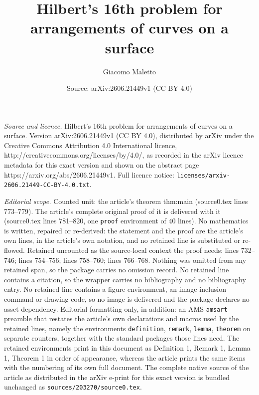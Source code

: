 \documentclass[10pt,a4paper]{amsart}
\title{Hilbert's 16th problem for arrangements of curves on a surface}
\author{Giacomo Maletto}
\date{Source: arXiv:2606.21449v1 (CC BY 4.0)}
\begin{document}
\maketitle

\noindent\emph{Source and licence.} Hilbert's 16th problem for arrangements of curves on a surface. Version arXiv:2606.21449v1 (CC BY 4.0), distributed by arXiv under the Creative Commons Attribution 4.0 International licence, http://creativecommons.org/licenses/by/4.0/, as recorded in the arXiv licence metadata for this exact version and shown on the abstract page https://arxiv.org/abs/2606.21449v1. Full licence notice: \texttt{licenses/arxiv-2606.21449-CC-BY-4.0.txt}.\par\smallskip

\noindent\textit{Editorial scope.} Counted unit: the article's theorem thm:main (source0.tex lines 773--779). The article's complete original proof of it is delivered with it (source0.tex lines 781--820, one \texttt{proof} environment of 40 lines). No mathematics is written, repaired or re-derived: the statement and the proof are the article's own lines, in the article's own notation, and no retained line is substituted or re-flowed.  Retained uncounted as the source-local context the proof needs: lines 732--746; lines 754--756; lines 758--760; lines 766--768.  Nothing was omitted from any retained span, so the package carries no omission record.  No retained line contains a citation, so the wrapper carries no bibliography and no bibliography entry.  No retained line contains a figure environment, an image-inclusion command or drawing code, so no image is delivered and the package declares no asset dependency.  Editorial formatting only, in addition: an AMS \texttt{amsart} preamble that restates the article's own declarations and macros used by the retained lines, namely the environments \texttt{definition}, \texttt{remark}, \texttt{lemma}, \texttt{theorem} on separate counters, together with the standard packages those lines need.  The retained environments print in this document as Definition 1, Remark 1, Lemma 1, Theorem 1 in order of appearance, whereas the article prints the same items with the numbering of its own full document.  The complete native source of the article as distributed in the arXiv e-print for this exact version is bundled unchanged as \texttt{sources/203270/source0.tex}.
\end{document}
